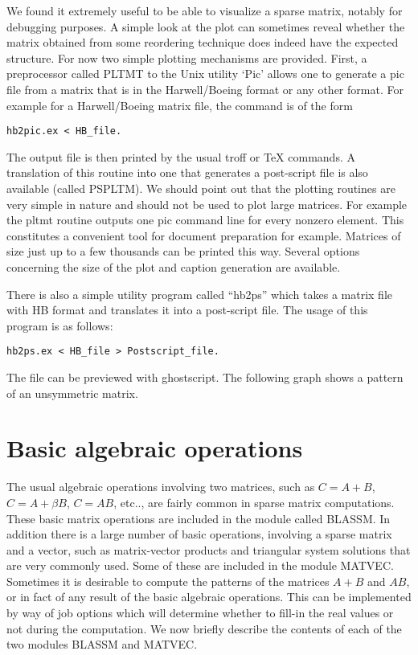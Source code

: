 We found it extremely useful to be able to visualize a sparse matrix,
notably for debugging purposes.  A simple look at the plot can
sometimes reveal whether the matrix obtained from some reordering
technique does indeed have the expected structure.  For now two simple
plotting mechanisms are provided. First, a preprocessor called PLTMT
to the Unix utility `Pic'  allows one to generate a pic file from a
matrix that is in the Harwell/Boeing format or any other format. For
example for a Harwell/Boeing matrix file, the command is of the form
\begin{center}
{\tt hb2pic.ex < HB\_file.}
\end{center}
The output file is then printed by the usual troff or TeX commands. A
translation of this routine into one that generates a post-script file
is also available (called PSPLTM). We should point out that the
plotting routines are very simple in nature and should not be used to
plot large matrices. For example the pltmt routine outputs one pic
command line for every nonzero element.  This constitutes a convenient
tool for document preparation for example.  Matrices of size just up
to a few thousands can be printed this way.  Several options
concerning the size of the plot and caption generation are available.

There is also a simple utility program called ``hb2ps'' which takes a
matrix file with HB format and translates it into a post-script file.
The usage of this program is as follows:
\begin{center}
{\tt hb2ps.ex < HB\_file > Postscript\_file.}
\end{center}
The file can be previewed with ghostscript.
The following graph shows a pattern of an unsymmetric matrix.

\begin{figure}[htb]
\centerline{}
\end{figure}

\section{Basic algebraic operations}
The usual algebraic operations involving two matrices,
such as $C= A+ B$, $C= A+\beta B$, $C= A B $, etc..,
are fairly common in sparse matrix computations.
These basic matrix operations
are included in the module called BLASSM.  In addition there is a
large number of basic operations, involving a sparse matrix
and a vector, such as matrix-vector products and
triangular system solutions that are very commonly used. Some of
these are included in the module MATVEC.
Sometimes it is desirable to compute the 
patterns of the matrices $A+B$ and $AB$, or in fact of any result 
of the basic algebraic  operations. This can be implemented by
way of job options which will determine whether to fill-in the real
values or not during the computation.  
We now briefly describe the contents of each of the 
two modules BLASSM and MATVEC. 

